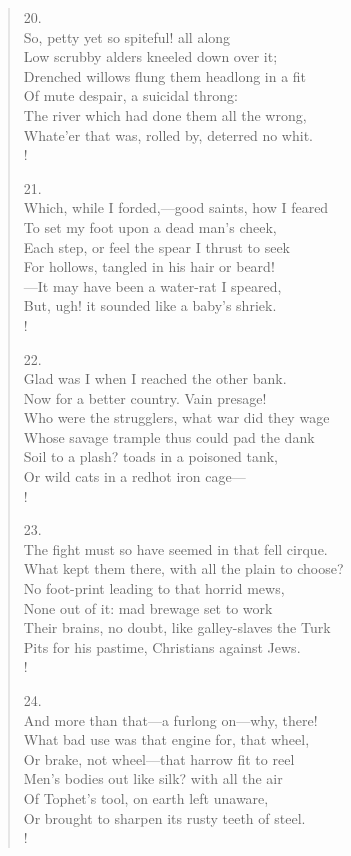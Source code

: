 \documentclass[10pt]{memoir}
\begin{document}
\begin{verse}
20.\\
So, petty yet so spiteful! all along\\
\vin Low scrubby alders kneeled down over it;\\
\vin Drenched willows flung them headlong in a fit\\
Of mute despair, a suicidal throng:\\
The river which had done them all the wrong,\\
\vin Whate'er that was, rolled by, deterred no whit.\\!

21.\\
Which, while I forded,---good saints, how I feared\\
\vin To set my foot upon a dead man's cheek,\\
\vin Each step, or feel the spear I thrust to seek\\
For hollows, tangled in his hair or beard!\\
---It may have been a water-rat I speared,\\
\vin But, ugh! it sounded like a baby's shriek.\\!

22.\\
Glad was I when I reached the other bank.\\
\vin Now for a better country. Vain presage!\\
\vin Who were the strugglers, what war did they wage\\
Whose savage trample thus could pad the dank\\
Soil to a plash? toads in a poisoned tank,\\
\vin Or wild cats in a redhot iron cage---\\!

23.\\
The fight must so have seemed in that fell cirque.\\
\vin What kept them there, with all the plain to choose?\\
\vin No foot-print leading to that horrid mews,\\
None out of it: mad brewage set to work\\
Their brains, no doubt, like galley-slaves the Turk\\
\vin Pits for his pastime, Christians against Jews.\\!

24.\\
And more than that---a furlong on---why, there!\\
\vin What bad use was that engine for, that wheel,\\
\vin Or brake, not wheel---that harrow fit to reel\\
Men's bodies out like silk? with all the air\\
Of Tophet's tool, on earth left unaware,\\
\vin Or brought to sharpen its rusty teeth of steel.\\!


\end{verse}
\end{document}
